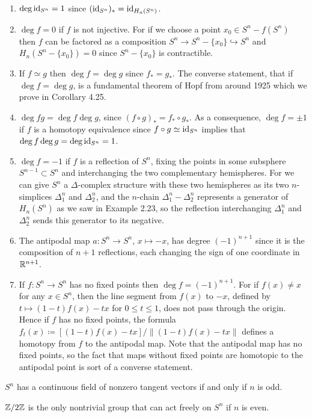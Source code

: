 \begin{enumerate}[label=(\arabic*)]
\item $\deg\operatorname{id}_{S^n}=1$ since $(\operatorname{id}_{S^n})_*=\operatorname{id}_{H_n(S^n)}$.
\item $\deg f=0$ if $f$ is not injective. For if we choose a point $x_0\in
  S^n\minus f(S^n)$ then $f$ can be factored as a composition $S^n\to
  S^n\minus\{x_0\}\hookrightarrow S^n$ and $H_n(S^n\minus\{x_0\})=0$ since
  $S^n\minus\{x_0\}$ is contractible.
\item If $f\simeq g$ then $\deg f=\deg g$ since $f_*=g_*$. The converse
  statement, that if $\deg f=\deg g$, is a fundamental theorem of Hopf from
  around 1925 which we prove in Corollary 4.25.
\item $\deg fg=\deg f\deg g$, since $(f\circ g)_*=f_*\circ g_*$. As a
  consequence, $\deg f=\pm 1$ if $f$ is a homotopy equivalence since
  $f\circ g\simeq \operatorname{id}_{S^n}$ implies that $\deg f\deg g=\deg\operatorname{id}_{S^n}=1$.
\item $\deg f=-1$ if $f$ is a reflection of $S^n$, fixing the points in
  some subsphere $S^{n-1}\subset S^n$ and interchanging the two
  complementary hemispheres. For we can give $S^n$ a $\Delta$-complex
  structure with these two hemispheres as its two $n$-simplices
  $\Delta_1^n$ and $\Delta_2^n$, and the $n$-chain $\Delta_1^n-\Delta_2^n$
  represents a generator of $H_n(S^n)$ as we saw in Example 2.23, so the
  reflection interchanging $\Delta_1^n$ and $\Delta_2^n$ sends this
  generator to its negative.
\item The antipodal map $a\colon S^n\to S^n$, $x\mapsto -x$, has degree
  $(-1)^{n+1}$ since it is the composition of $n+1$ reflections, each
  changing the sign of one coordinate in $\mathbb{R}^{n+1}$.
\item If $f\colon S^n\to S^n$ has no fixed points then $\deg
  f=(-1)^{n+1}$. For if $f(x)\neq x$ for any $x\in S^n$, then the line
  segment from $f(x)$ to $-x$, defined by $t\mapsto(1-t)f(x)-tx$ for $0\leq
  t\leq 1$, does not pass through the origin. Hence if $f$ has no fixed
  points, the formula $f_t(x)\coloneqq[(1-t)f(x)-tx]/\|(1-t)f(x)-tx\|$
  defines a homotopy from $f$ to the antipodal map. Note that the antipodal
  map has no fixed points, so the fact that maps without fixed points are
  homotopic to the antipodal point is sort of a converse statement.
\end{enumerate}
\begin{theorem}[2.8]
$S^n$ has a continuous field of nonzero tangent vectors if and only if $n$
is odd.
\end{theorem}
\begin{proposition*}[2.29]
$\mathbb{Z}/2\mathbb{Z}$ is the only nontrivial group that can act freely on $S^n$ if
$n$ is even.
\end{proposition*}

